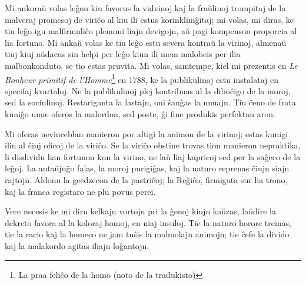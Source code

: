 \documentclass{book}
\begin{document}
Mi ankoraŭ volas leĝon kiu favorus la vidvinoj kaj la fraŭlinoj
trompitaj de la malveraj promesoj de viriĉo al kiu ili estus
korinkliniĝitaj; mi volas, mi diras, ke tiu leĝo igu malfirmuliĉo
plenumi liajn devigojn, aŭ pagi kompenson proporcia al lia
fortuno. Mi ankaŭ volas ke tiu leĝo estu severa kontraŭ la
virinoj, almenaŭ tiuj kiuj aŭdacus sin helpi per leĝo kiun ili
mem malobeis per ilia malbonkonduto, se tio estas pruvita. Mi
volas, samtempe, kiel mi prezentis en \textit{Le Bonheur primitif
de l'Homme}\footnote{La praa feliĉo de la homo (noto de la
tradukisto)} en 1788, ke la publikulinoj estu instalataj en
specifaj kvartaloj. Ne la publikulinoj plej kontribuas al la
diboĉigo de la moroj, sed la sociulinoj. Restariganta la lastajn,
oni ŝanĝas la unuajn. Tiu ĉeno de frata kuniĝo unue oferos la
malordon, sed poste, ĝi fine produkis perfektan aron.

Mi oferas nevinceblan manieron por altigi la animon de la
virinoj; estas kunigi ilin al ĉiuj oficoj de la viriĉo. Se la
viriĉo obstine trovas tion manieron nepraktika, li disdividu lian
fortunon kun la virino, ne laŭ liaj kapricoj sed per la saĝeco de
la leĝoj. La antaŭjuĝo falas, la moroj purigiĝas, kaj la naturo
reprenas ĉiujn siajn rajtojn. Aldonu la geedzecon de la
pastriĉoj; la Reĝiĉo, firmigata sur lia trono, kaj la franca
registaro ne plu povus perei.

Vere necesis ke mi diru kelkajn vortojn pri la ĝenoj kiujn
kaŭzas, laŭdire la dekreto favora al la koloraj homoj, en niaj
insuloj. Tie la naturo horore tremas, tie la racio kaj la homeco
ne jam tuŝis la malmolajn animojn; tie ĉefe la divido kaj la
malakordo agitas iliajn loĝantojn.
\end{document}
